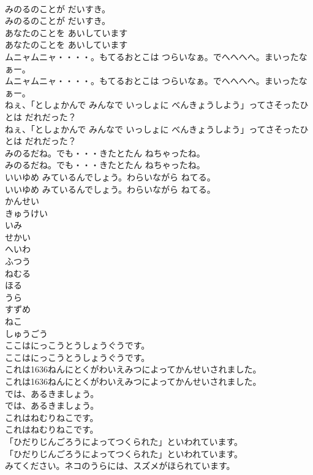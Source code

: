 \documentclass[8pt]{extreport}
\begin{document}
\begin{CJK}{UTF8}{min}
\\	みのるのことが だいすき。
\\	みのるのことが だいすき。
\\	あなたのことを あいしています
\\	あなたのことを あいしています
\\	ムニャムニャ・・・・。もてるおとこは つらいなぁ。でへへへへ。まいったなぁー。
\\	ムニャムニャ・・・・。もてるおとこは つらいなぁ。でへへへへ。まいったなぁー。
\\	ねぇ、「としょかんで みんなで いっしょに べんきょうしよう」ってさそったひとは だれだった？
\\	ねぇ、「としょかんで みんなで いっしょに べんきょうしよう」ってさそったひとは だれだった？
\\	みのるだね。でも・・・きたとたん ねちゃったね。
\\	みのるだね。でも・・・きたとたん ねちゃったね。
\\	いいゆめ みているんでしょう。わらいながら ねてる。
\\	いいゆめ みているんでしょう。わらいながら ねてる。
\\	かんせい
\\	きゅうけい
\\	いみ
\\	せかい
\\	へいわ
\\	ふつう
\\	ねむる
\\	ほる
\\	うら
\\	すずめ
\\	ねこ
\\	しゅうごう
\\	ここはにっこうとうしょうぐうです。
\\	ここはにっこうとうしょうぐうです。
\\	これは1636ねんにとくがわいえみつによってかんせいされました。
\\	これは1636ねんにとくがわいえみつによってかんせいされました。
\\	では、あるきましょう。
\\	では、あるきましょう。
\\	これはねむりねこです。
\\	これはねむりねこです。
\\	「ひだりじんごろうによってつくられた」といわれています。
\\	「ひだりじんごろうによってつくられた」といわれています。
\\	みてください。ネコのうらには、スズメがほられています。

\end{CJK}
\end{document}

